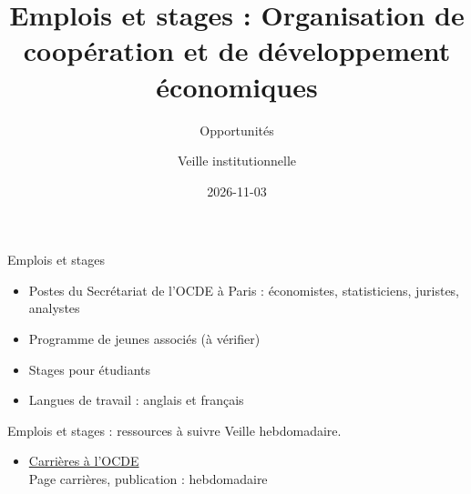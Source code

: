 \documentclass[aspectratio=169,11pt]{beamer}
\title{Emplois et stages : Organisation de coopération et de développement économiques}
\subtitle{Opportunités}
\author{Veille institutionnelle}
\date{2026-11-03}
\begin{document}
\begin{frame}\titlepage\end{frame}

\begin{frame}{Emplois et stages}
\begin{itemize}
\item Postes du Secrétariat de l'OCDE à Paris : économistes, statisticiens, juristes, analystes
\item Programme de jeunes associés (à vérifier)
\item Stages pour étudiants
\item Langues de travail : anglais et français
\end{itemize}
\end{frame}

\begin{frame}{Emplois et stages : ressources à suivre}
\small
Veille hebdomadaire.
\begin{itemize}
\item \href{https://www.oecd.org/en/about/careers.html}{Carrières à l'OCDE}\\{\footnotesize Page carrières, publication : hebdomadaire}
\end{itemize}
\end{frame}
\end{document}
